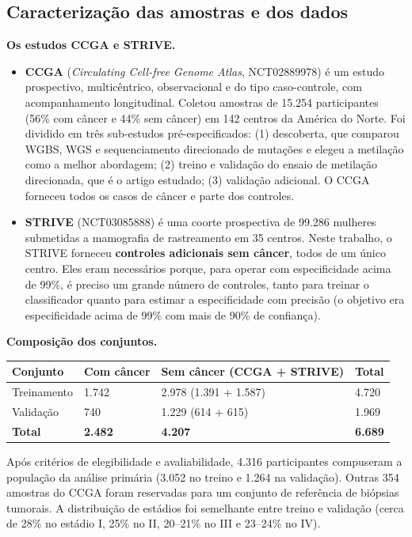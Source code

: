 \documentclass[11pt,a4paper]{article}
\providecommand{\tightlist}{\setlength{\itemsep}{0pt}\setlength{\parskip}{0pt}}
\begin{document}
\subsection{Caracterização das amostras e dos dados}

\textbf{Os estudos CCGA e STRIVE.}

\begin{itemize}
\tightlist
\item
  \textbf{CCGA} (\emph{Circulating Cell-free Genome Atlas}, NCT02889978) é um
  estudo prospectivo, multicêntrico, observacional e do tipo caso-controle, com
  acompanhamento longitudinal. Coletou amostras de 15.254 participantes (56\%
  com câncer e 44\% sem câncer) em 142 centros da América do Norte. Foi dividido
  em três sub-estudos pré-especificados: (1) descoberta, que comparou WGBS, WGS
  e sequenciamento direcionado de mutações e elegeu a metilação como a melhor
  abordagem; (2) treino e validação do ensaio de metilação direcionada, que é o
  artigo estudado; (3) validação adicional. O CCGA forneceu todos os casos de
  câncer e parte dos controles.
\item
  \textbf{STRIVE} (NCT03085888) é uma coorte prospectiva de 99.286 mulheres
  submetidas a mamografia de rastreamento em 35 centros. Neste trabalho, o
  STRIVE forneceu \textbf{controles adicionais sem câncer}, todos de um único
  centro. Eles eram necessários porque, para operar com especificidade acima de
  99\%, é preciso um grande número de controles, tanto para treinar o
  classificador quanto para estimar a especificidade com precisão (o objetivo
  era especificidade acima de 99\% com mais de 90\% de confiança).
\end{itemize}

\textbf{Composição dos conjuntos.}

{\def\LTcaptype{none} %
\begin{longtable}[]{@{}llll@{}}
\toprule\noalign{}
Conjunto & Com câncer & Sem câncer (CCGA + STRIVE) & Total \\
\midrule\noalign{}
\endhead
\bottomrule\noalign{}
\endlastfoot
Treinamento & 1.742 & 2.978 (1.391 + 1.587) & 4.720 \\
Validação & 740 & 1.229 (614 + 615) & 1.969 \\
\textbf{Total} & \textbf{2.482} & \textbf{4.207} & \textbf{6.689} \\
\end{longtable}
}

Após critérios de elegibilidade e avaliabilidade, 4.316 participantes compuseram
a população da análise primária (3.052 no treino e 1.264 na validação). Outras
354 amostras do CCGA foram reservadas para um conjunto de referência de biópsias
tumorais. A distribuição de estádios foi semelhante entre treino e validação
(cerca de 28\% no estádio I, 25\% no II, 20--21\% no III e 23--24\% no IV).
\end{document}
